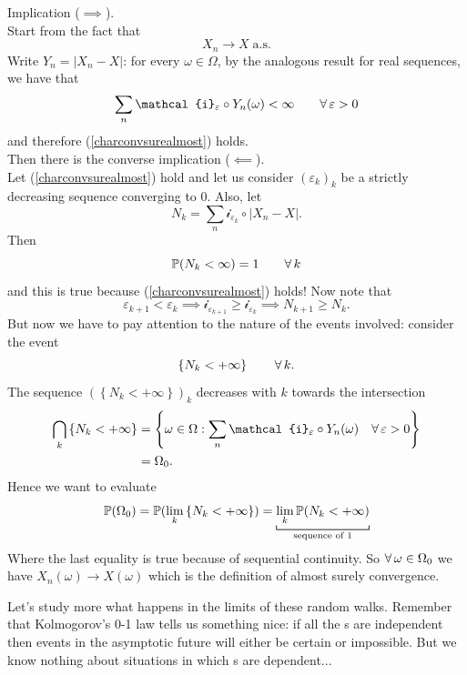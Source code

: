 \documentclass{report}
\begin{document}
\begin{fancyproof}
	Implication ($\implies$).\\
	Start from the fact that 
	\[X_n\to X\;\text{a.s.}\]
	Write $Y_n=|X_n-X|$: for every $\omega\in\Omega$, by the analogous result for real sequences, we have that 
	\[\sum_n\mathcal{i}_\varepsilon\circ Y_n(\omega)<\infty\qquad\every\varepsilon>0\]
	and therefore (\ref{charconvsurealmost}) holds.\\
	Then there is the converse implication ($\impliedby$).\\
	Let (\ref{charconvsurealmost}) hold and let us consider ${(\varepsilon_k)}_{k}$ be a strictly decreasing sequence converging to 0. Also, let
	\[N_k=\sum_n\mathcal{i}_{\varepsilon_k}\circ|X_n-X|.\]
	Then
	\[\mathbb{P}(N_k<\infty)=1\qquad\forall\, k\]
	and this is true because (\ref{charconvsurealmost}) holds! Now note that 
	\[\varepsilon_{k+1}<\varepsilon_k\implies\mathcal{i}_{\varepsilon_{k+1}}\geq\mathcal{i}_{\varepsilon_k}\implies N_{k+1}\geq N_{k}.\]
	But now we have to pay attention to the nature of the events involved: consider the event
	\[\left\{N_k<+\infty\right\}\qquad\forall\, k.\]
	The sequence $\left(\left\{N_k<+\infty\right\}\right)_{k}$ decreases with $k$ towards the intersection
	\begin{align*}
		\bigcap_k\left\{N_k<+\infty\right\}&=\left\{\omega\in\Omega:\sum_n\mathcal{i}_\varepsilon\circ Y_n(\omega)\quad \every\varepsilon>0\right\}\\
		&=\Omega_0.
	\end{align*}
	Hence we want to evaluate
	\[\pr(\Omega_0)=\pr(\lim_k\left\{N_k<+\infty\right\})=\underbracket[0.6pt]{\lim_k\pr(N_k<+\infty)}_{\text{sequence of 1}}\]
	Where the last equality is true because of sequential continuity. So $\forall\, \omega \in \Omega_0$ we have $X_n(\omega)\to X(\omega)$ which is the definition of almost surely convergence.
\end{fancyproof}
Let's study more what happens in the limits of these random walks. Remember that Kolmogorov's 0-1 law tells us something nice: if all the \rv s are independent then events in the asymptotic future will either be certain or impossible. But we know nothing about situations in which \rv s are dependent...
\end{document}
